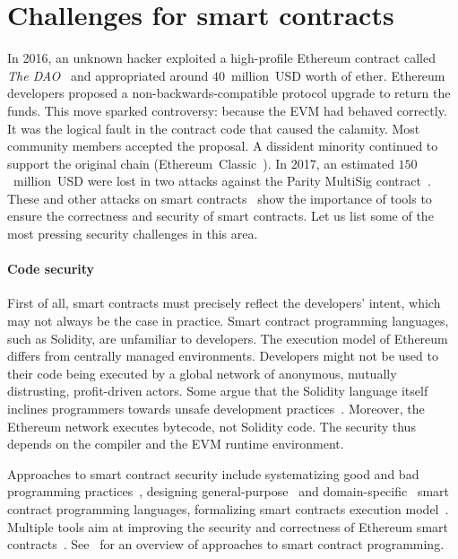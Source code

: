 \section{Challenges for smart contracts}

In 2016, an unknown hacker exploited a high-profile Ethereum contract called \textit{The DAO}~\cite{Sirer2016} and appropriated around $40$~million~USD worth of ether.
Ethereum developers proposed a non-backwards-compatible protocol upgrade to return the funds.
This move sparked controversy: because the EVM had behaved correctly.
It was the logical fault in the contract code that caused the calamity.
Most community members accepted the proposal.
A dissident minority continued to support the original chain (Ethereum~Classic~\cite{EthereumClassic}).
In 2017, an estimated $150$~million~USD were lost in two attacks against the Parity MultiSig contract~\cite{Palladino2017}.
These and other attacks on smart contracts~\cite{Delmolino2016, Atzei2017} show the importance of tools to ensure the correctness and security of smart contracts.
Let us list some of the most pressing security challenges in this area.

\paragraph{Code security}
First of all, smart contracts must precisely reflect the developers' intent, which may not always be the case in practice.
Smart contract programming languages, such as Solidity, are unfamiliar to developers.
The execution model of Ethereum differs from centrally managed environments.
Developers might not be used to their code being executed by a global network of anonymous, mutually distrusting, profit-driven actors.
Some argue that the Solidity language itself inclines programmers towards unsafe development practices~\cite{ydtm2016}.
Moreover, the Ethereum network executes bytecode, not Solidity code.
The security thus depends on the compiler and the EVM runtime environment.

Approaches to smart contract security include systematizing good and bad programming practices~\cite{ConsenSys16, Chen2017}, designing general-purpose~\cite{Hirai2017a, Buterin2017b, Pettersson2016} and domain-specific~\cite{EgelundMueller2017} smart contract programming languages, formalizing smart contracts execution model~\cite{Sergey2017}.
Multiple tools aim at improving the security and correctness of Ethereum smart contracts~\cite{Bhargavan2016, Luu2016, Hirai2017, Hildenbrandt2018, Tsankov2018, Jiang2018, Slither, Manticore, Mythril, Echidna}.
See~\cite{Seijas2016} for an overview of approaches to smart contract programming.

